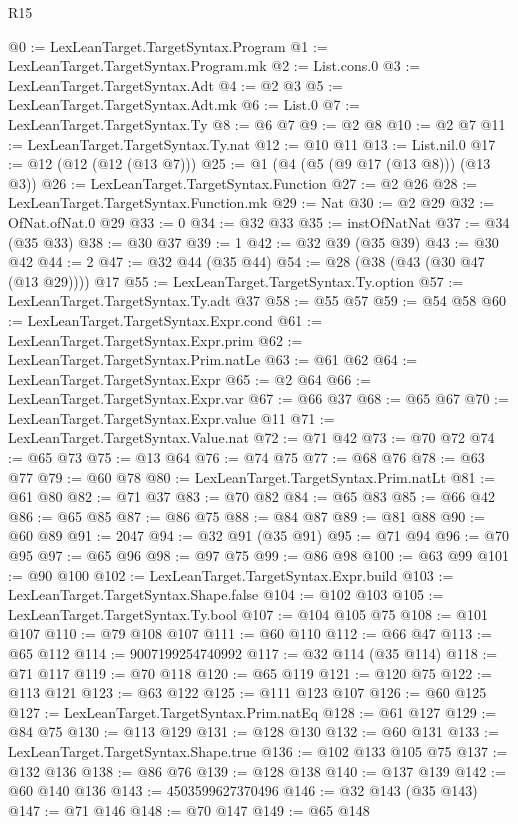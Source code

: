 \begin{lexlean}{R15}
\begin{coremodule}
@0 := LexLeanTarget.TargetSyntax.Program
@1 := LexLeanTarget.TargetSyntax.Program.mk
@2 := List.cons.{0}
@3 := LexLeanTarget.TargetSyntax.Adt
@4 := @2 @3
@5 := LexLeanTarget.TargetSyntax.Adt.mk
@6 := List.{0}
@7 := LexLeanTarget.TargetSyntax.Ty
@8 := @6 @7
@9 := @2 @8
@10 := @2 @7
@11 := LexLeanTarget.TargetSyntax.Ty.nat
@12 := @10 @11
@13 := List.nil.{0}
@17 := @12 (@12 (@12 (@13 @7)))
@25 := @1 (@4 (@5 (@9 @17 (@13 @8))) (@13 @3))
@26 := LexLeanTarget.TargetSyntax.Function
@27 := @2 @26
@28 := LexLeanTarget.TargetSyntax.Function.mk
@29 := Nat
@30 := @2 @29
@32 := OfNat.ofNat.{0} @29
@33 := 0
@34 := @32 @33
@35 := instOfNatNat
@37 := @34 (@35 @33)
@38 := @30 @37
@39 := 1
@42 := @32 @39 (@35 @39)
@43 := @30 @42
@44 := 2
@47 := @32 @44 (@35 @44)
@54 := @28 (@38 (@43 (@30 @47 (@13 @29)))) @17
@55 := LexLeanTarget.TargetSyntax.Ty.option
@57 := LexLeanTarget.TargetSyntax.Ty.adt @37
@58 := @55 @57
@59 := @54 @58
@60 := LexLeanTarget.TargetSyntax.Expr.cond
@61 := LexLeanTarget.TargetSyntax.Expr.prim
@62 := LexLeanTarget.TargetSyntax.Prim.natLe
@63 := @61 @62
@64 := LexLeanTarget.TargetSyntax.Expr
@65 := @2 @64
@66 := LexLeanTarget.TargetSyntax.Expr.var
@67 := @66 @37
@68 := @65 @67
@70 := LexLeanTarget.TargetSyntax.Expr.value @11
@71 := LexLeanTarget.TargetSyntax.Value.nat
@72 := @71 @42
@73 := @70 @72
@74 := @65 @73
@75 := @13 @64
@76 := @74 @75
@77 := @68 @76
@78 := @63 @77
@79 := @60 @78
@80 := LexLeanTarget.TargetSyntax.Prim.natLt
@81 := @61 @80
@82 := @71 @37
@83 := @70 @82
@84 := @65 @83
@85 := @66 @42
@86 := @65 @85
@87 := @86 @75
@88 := @84 @87
@89 := @81 @88
@90 := @60 @89
@91 := 2047
@94 := @32 @91 (@35 @91)
@95 := @71 @94
@96 := @70 @95
@97 := @65 @96
@98 := @97 @75
@99 := @86 @98
@100 := @63 @99
@101 := @90 @100
@102 := LexLeanTarget.TargetSyntax.Expr.build
@103 := LexLeanTarget.TargetSyntax.Shape.false
@104 := @102 @103
@105 := LexLeanTarget.TargetSyntax.Ty.bool
@107 := @104 @105 @75
@108 := @101 @107
@110 := @79 @108 @107
@111 := @60 @110
@112 := @66 @47
@113 := @65 @112
@114 := 9007199254740992
@117 := @32 @114 (@35 @114)
@118 := @71 @117
@119 := @70 @118
@120 := @65 @119
@121 := @120 @75
@122 := @113 @121
@123 := @63 @122
@125 := @111 @123 @107
@126 := @60 @125
@127 := LexLeanTarget.TargetSyntax.Prim.natEq
@128 := @61 @127
@129 := @84 @75
@130 := @113 @129
@131 := @128 @130
@132 := @60 @131
@133 := LexLeanTarget.TargetSyntax.Shape.true
@136 := @102 @133 @105 @75
@137 := @132 @136
@138 := @86 @76
@139 := @128 @138
@140 := @137 @139
@142 := @60 @140 @136
@143 := 4503599627370496
@146 := @32 @143 (@35 @143)
@147 := @71 @146
@148 := @70 @147
@149 := @65 @148

\end{coremodule}
\end{lexlean}
